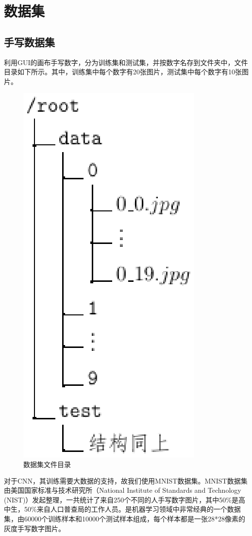 \documentclass[UTF8, a4paper, 12pt]{report}
\begin{document}
\chapter{数据集}
	\section{手写数据集}
		利用GUI的画布手写数字，分为训练集和测试集，并按数字名存到文件夹中，文件目录如下所示。其中，训练集中每个数字有20张图片，测试集中每个数字有10张图片。
		\begin{figure}[!h]
			\centering
			\includegraphics[scale=0.8]{./img/DataDirTree.eps}
			\caption{数据集文件目录}
			\label{fig:3.1}
		\end{figure}

		对于CNN，其训练需要大数据的支持，故我们使用MNIST数据集。MNIST数据集由美国国家标准与技术研究所（National Institute of Standards and Technology (NIST)）发起整理，一共统计了来自250个不同的人手写数字图片，其中50\%是高中生，50\%来自人口普查局的工作人员。是机器学习领域中非常经典的一个数据集，由60000个训练样本和10000个测试样本组成，每个样本都是一张28*28像素的灰度手写数字图片。
\end{document}
